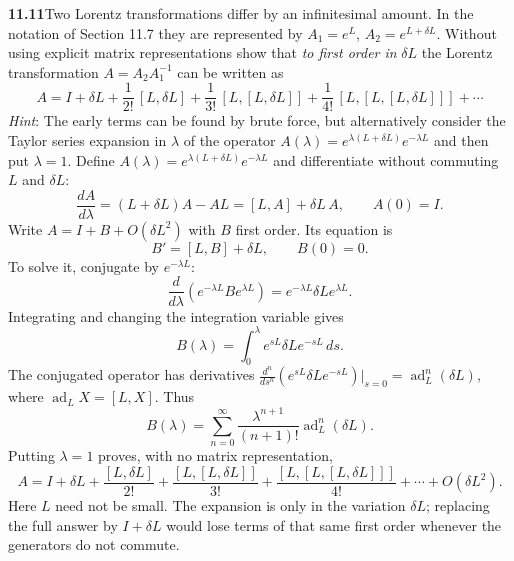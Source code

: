 \par\bigskip
\noindent\textbf{11.11}\quad Two Lorentz transformations differ by an infinitesimal amount. In the notation of Section 11.7 they are represented by $A_{1}=e^{L}$, $A_{2}=e^{L+\delta L}$. Without using explicit matrix representations show that \emph{to first order in} $\delta L$ the Lorentz transformation $A=A_{2}A_{1}^{-1}$ can be written as
\[
A=I+\delta L+\frac{1}{2!}\,[L,\delta L]+\frac{1}{3!}\,[L,[L,\delta L]]+\frac{1}{4!}\,[L,[L,[L,\delta L]]]+\cdots
\]
\emph{Hint}: The early terms can be found by brute force, but alternatively consider the Taylor series expansion in $\lambda$ of the operator $A(\lambda)=e^{\lambda(L+\delta L)}e^{-\lambda L}$ and then put $\lambda=1$.
\solution
Define $A(\lambda)=e^{\lambda(L+\delta L)}e^{-\lambda L}$ and
differentiate without commuting $L$ and $\delta L$:
\[
\frac{dA}{d\lambda}=(L+\delta L)A-AL=[L,A]+\delta L\,A,
\qquad A(0)=I.
\]
Write $A=I+B+O(\delta L^2)$ with $B$ first order. Its equation is
\[
B'=[L,B]+\delta L,\qquad B(0)=0.
\]
To solve it, conjugate by $e^{-\lambda L}$:
\[
\frac d{d\lambda}(e^{-\lambda L}Be^{\lambda L})
=e^{-\lambda L}\delta L e^{\lambda L}.
\]
Integrating and changing the integration variable gives
\[
B(\lambda)=\int_0^\lambda e^{sL}\delta L e^{-sL}\,ds.
\]
The conjugated operator has derivatives
$\frac{d^n}{ds^n}(e^{sL}\delta Le^{-sL})|_{s=0}
=\operatorname{ad}_L^n(\delta L)$, where
$\operatorname{ad}_L X=[L,X]$. Thus
\[
B(\lambda)=\sum_{n=0}^\infty
\frac{\lambda^{n+1}}{(n+1)!}\operatorname{ad}_L^n(\delta L).
\]
Putting $\lambda=1$ proves, with no matrix representation,
\[
\boxed{A=I+\delta L+\frac{[L,\delta L]}{2!}
+\frac{[L,[L,\delta L]]}{3!}
+\frac{[L,[L,[L,\delta L]]]}{4!}+\cdots
+O(\delta L^2).}
\]
Here $L$ need not be small. The expansion is only in the variation
$\delta L$; replacing the full answer by $I+\delta L$ would lose
terms of that same first order whenever the generators do not commute.

